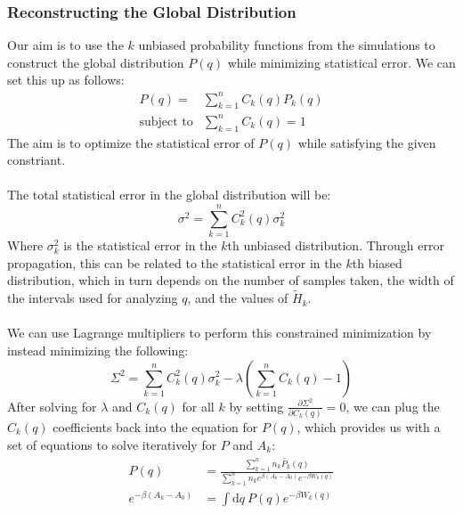 \documentclass{article}
\begin{document}

\subsubsection{Reconstructing the Global Distribution}
Our aim is to use the $k$ unbiased probability functions from the simulations to construct the global distribution $P(q)$ while minimizing statistical error.
We can set this up as follows:
\begin{align*}
    P(q) = &\sum_{k=1}^n C_k(q) P_k(q)\\
    \text{subject to} &\sum_{k=1}^n C_k(q) = 1
\end{align*}
The aim is to optimize the statistical error of $P(q)$ while satisfying the given constriant.
\\\\
The total statistical error in the global distribution will be:
$$ \sigma^2 = \sum_{k=1}^n C_k^2(q) \sigma_k^2 $$
Where $\sigma_k^2$ is the statistical error in the $k$th unbiased distribution.
Through error propagation, this can be related to the statistical error in the $k$th biased distribution, which in turn depends on the number of samples taken, the width of the intervals used for analyzing $q$, and the values of $\tilde{H}_k$.
\\\\
We can use Lagrange multipliers to perform this constrained minimization by instead minimizing the following:
$$ \Sigma^2 = \sum_{k=1}^n C_k^2(q) \sigma_k^2 - \lambda \left(\sum_{k=1}^n C_k(q) - 1\right)$$
After solving for $\lambda$ and $C_k(q)$ for all $k$ by setting $\frac{\partial \Sigma^2}{\partial C_k(q)} = 0$, we can plug the $C_k(q)$ coefficients back into the equation for $P(q)$, which provides us with a set of equations to solve iteratively for $P$ and $A_k$:
\begin{align*}
    P(q) &= \frac{\sum_{k=1}^n n_k \tilde{P_k}(q)}{\sum_{k=1}^n n_k e^{\beta (A_k - A_0)} e^{-\beta W_k(q)}}\\
    e^{-\beta (A_k - A_0)} &= \int \text{d}q \ P(q) e^{-\beta W_k(q)}
\end{align*}
\end{document}

